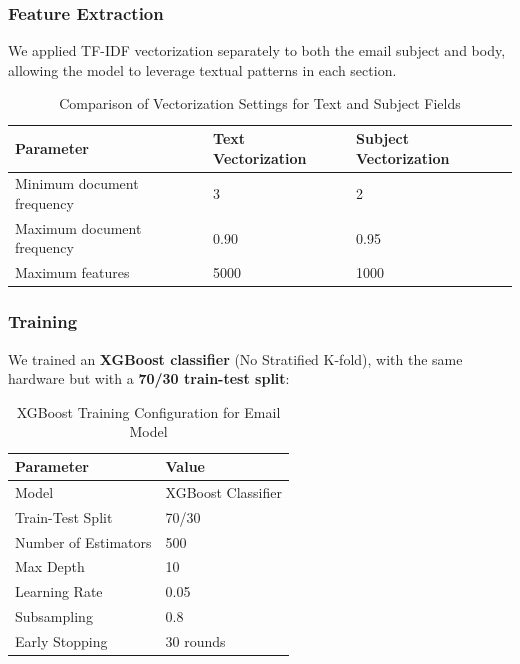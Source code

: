 \documentclass{article}
\begin{document}
\subsubsection*{Feature Extraction}
We applied TF-IDF vectorization separately to both the email subject and body, allowing the model to leverage textual patterns in each section.
\newline
\newline

\begin{table}[H]
\renewcommand{\arraystretch}{1.3}
\setlength{\tabcolsep}{12pt}
\centering
\begin{tabular}{|p{6cm}|p{5cm}|p{4cm}|}
\hline
\textbf{Parameter} & \textbf{Text Vectorization} & \textbf{Subject Vectorization} \\
\hline
Minimum document frequency & 3 & 2 \\
\hline
Maximum document frequency & 0.90 & 0.95 \\
\hline
Maximum features & 5000 & 1000 \\
\hline
\end{tabular}
\caption{Comparison of Vectorization Settings for Text and Subject Fields}
\label{tab:vectorization_settings}
\end{table}

\subsubsection*{Training}
We trained an \textbf{XGBoost classifier} (No Stratified K-fold), with the same hardware but with a \textbf{70/30 train-test split}:

\begin{table}[h!]
    \centering
    \renewcommand{\arraystretch}{1.2}
    \setlength{\tabcolsep}{11pt}
    \begin{tabular}{|l|l|}
        \hline
        \textbf{Parameter} & \textbf{Value} \\
        \hline
        Model & XGBoost Classifier \\
        \hline
        Train-Test Split & 70/30 \\
        \hline
        Number of Estimators & 500 \\
        \hline
        Max Depth & 10 \\
        \hline
        Learning Rate & 0.05 \\
        \hline
        Subsampling & 0.8 \\
        \hline
        Early Stopping & 30 rounds \\
        \hline
    \end{tabular}
    \caption{XGBoost Training Configuration for Email Model}
\end{table}
\end{document}
